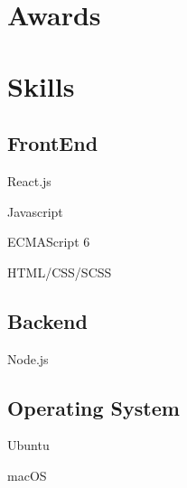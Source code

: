 \documentclass[]{deedy-resume-openfont}
\begin{document}
\begin{minipage}[t]{0.5\textwidth}
\sectionsep


\section{Awards}


\sectionsep


\section{Skills}

\begin{minipage}[t]{0.45\textwidth}
    \subsection{FrontEnd}
    \vspace{\topsep}
    \begin{tightemize}
        \item React.js
        \item Javascript
        \item ECMAScript 6
        \item HTML/CSS/SCSS
    \end{tightemize}
\end{minipage}
\hfill
\begin{minipage}[t]{0.45\textwidth}
    \subsection{Backend}
    \vspace{\topsep}
    \begin{tightemize}
        \item Node.js
    \end{tightemize}
\end{minipage}

\vspace{\topsep}
\begin{minipage}[t]{0.45\textwidth}
    \subsection{Operating System}
    \vspace{\topsep}
    \begin{tightemize}
        \item Ubuntu
        \item macOS
    \end{tightemize}
\end{minipage}
\hfill
\begin{minipage}[t]{0.45\textwidth}

\end{minipage}
\end{minipage}
\end{document}
